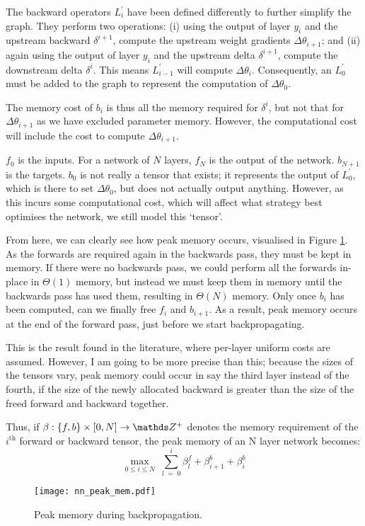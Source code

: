 The backward operators \(L^\prime_i\) have been defined differently to further simplify the graph. They perform two operations:
(i) using the output of layer \(y_i\) and the upstream backward \(\delta^{i+1}\), compute the upstream weight gradients \(\Delta\theta_{i+1}\); and
(ii) again using the output of layer \(y_i\) and the upstream delta \(\delta^{i+1}\), compute the downstream delta \(\delta^i\).
This means \(L^\prime_{i-1}\) will compute \(\Delta\theta_{i}\).
Consequently, an \(L^\prime_0\) must be added to the graph to represent the computation of \(\Delta\theta_0\).

The memory cost of \(b_i\) is thus all the memory required for \(\delta^i\), but not that for \(\Delta\theta_{i+1}\) as we have excluded parameter memory. However, the computational cost will include the cost to compute \(\Delta\theta_{i+1}\).

\(f_0\) is the inputs. For a network of \(N\) layers, \(f_N\) is the output of the network. \(b_{N+1}\) is the targets. \(b_0\) is not really a tensor that exists; it represents the output of \(L^\prime_{0}\), which is there to set \(\Delta\theta_0\), but does not actually output anything. However, as this incurs some computational cost, which will affect what strategy best optimises the network, we still model this `tensor'.

From here, we can clearly see how peak memory occurs, visualised in Figure \ref{fig:2-nn-peak-mem}.
As the forwards are required again in the backwards pass, they must be kept in memory.
If there were no backwards pass, we could perform all the forwards in-place in \(\Theta(1)\) memory, but instead we must keep them in memory until the backwards pass has used them, resulting in \(\Theta(N)\) memory.
Only once \(b_i\) has been computed, can we finally free \(f_i\) and \(b_{i+1}\).
As a result, peak memory occurs at the end of the forward pass, just before we start backpropagating.

This is the result found in the literature, where per-layer uniform costs are assumed.
However, I am going to be more precise than this;
because the sizes of the tensors vary, peak memory could occur in say the third layer instead of the fourth, if the size of the newly allocated backward is greater than the size of the freed forward and backward together.

Thus, if \(\beta : \{f, b\}\times[0, N] \rightarrow \Z^+\) denotes the memory requirement of the \(i^{\mathrm{th}}\) forward or backward tensor, the peak memory of an N layer network becomes:
\begin{equation}
    \label{eqn:2-nn-peak-mem}
    \max_{0 \leq i \leq N}\; \sum_{l\;=\;0}^i \beta^f_l + \beta^b_{i+1} + \beta^b_i
\end{equation}

\vspace{4cm}

\begin{figure}[h]
    \centering
    \texttt{[image: nn\_peak\_mem.pdf]}
    \caption{Peak memory during backpropagation.}
    \label{fig:2-nn-peak-mem}
\end{figure}

\newpage